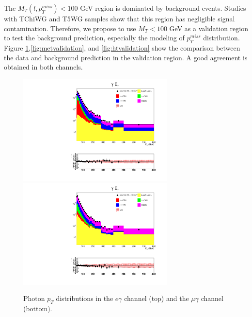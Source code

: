 \documentclass[thesis.tex]{subfiles}
\renewcommand\_{\textunderscore\allowbreak}
\begin{document}
The $M_T(l, p_{T}^{miss}) < 100$ GeV region is dominated by background events. Studies with TChiWG and T5WG samples show that this region has negligible signal contamination. Therefore, we propose to use $M_T < 100$ GeV as a validation region to test the background prediction, especially the modeling of $p_T^{miss}$ distribution. Figure \ref{fig:etvalidation},\ref{fig:metvalidation}, and \ref{fig:htvalidation} show the comparison between the data and background prediction in the validation region. A good agreement is obtained in both channels.

\begin{figure}[hbtp]
  \centering
    \includegraphics[width=0.7\textwidth]{Figures/VALID_egamma_2016ReMiniAOD_pt.pdf} \\
    \includegraphics[width=0.7\textwidth]{Figures/VALID_mg_2016ReMiniAOD_pt.pdf} 
  \caption{Photon $p_T$ distributions in the $e\gamma$ channel (top) and the $\mu\gamma$ channel (bottom).}
    \label{fig:etvalidation}
\end{figure}
\end{document}
